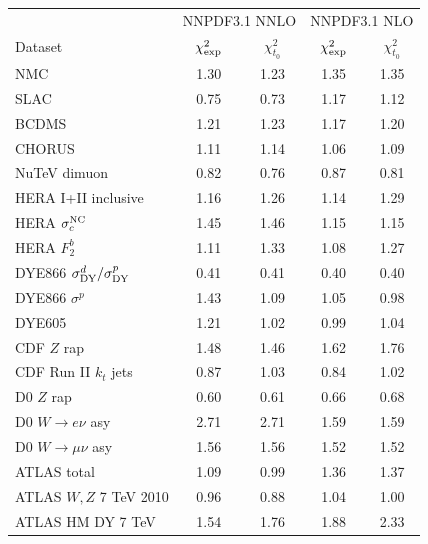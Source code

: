 \begin{table}[t]
\begin{center}
  \scriptsize
  \renewcommand{\arraystretch}{1.10}
\begin{tabular}{|l|c|c||c|c|}
\hline
 & \multicolumn{2}{c|}{NNPDF3.1 NNLO } & \multicolumn{2}{c|}{NNPDF3.1 NLO } \\
Dataset & $\chi^2_{\rm exp}$ & $\chi^2_{t_0}$ & $\chi^2_{\rm exp}$  & $\chi^2_{t_0}$    \\
\hline
\hline
NMC    &    1.30   &   1.23   &   1.35   &   1.35  \\    
SLAC    &    0.75   &   0.73   &   1.17   &   1.12  \\    
BCDMS    &    1.21   &   1.23   &   1.17   &   1.20  \\    
CHORUS    &    1.11   &   1.14   &   1.06   &   1.09  \\    
NuTeV dimuon    &    0.82   &   0.76   &   0.87   &   0.81  \\
\hline
HERA I+II inclusive    &    1.16   &   1.26   &   1.14   &   1.29  \\    
HERA $\sigma_c^{\rm NC}$    &    1.45   &   1.46   &   1.15   &   1.15  \\    
HERA $F_2^b$   &    1.11   &   1.33   &   1.08   &   1.27  \\    
\hline
\hline
DYE866 $\sigma^d_{\rm DY}/\sigma^p_{\rm DY}$    &    0.41   &   0.41   &   0.40   &   0.40  \\    
DYE866 $\sigma^p$     &    1.43   &   1.09   &   1.05   &   0.98  \\    
DYE605    &    1.21   &   1.02   &   0.99   &   1.04  \\    
\hline
CDF $Z$ rap     &    1.48   &   1.46   &   1.62   &   1.76  \\    
CDF Run II $k_t$ jets    &    0.87   &   1.03   &   0.84   &   1.02  \\
\hline
D0 $Z$ rap    &    0.60   &   0.61   &   0.66   &   0.68  \\    
D0 $W\to e\nu$  asy    &    2.71   &   2.71   &   1.59   &   1.59  \\    
D0 $W\to \mu\nu$  asy    &    1.56   &   1.56   &   1.52   &   1.52  \\
\hline
\hline
ATLAS total   &    1.09   &   0.99   &   1.36   &   1.37  \\    
ATLAS $W,Z$ 7 TeV 2010    &    0.96   &   0.88   &   1.04   &   1.00  \\    
ATLAS HM DY 7 TeV    &    1.54   &   1.76   &   1.88   &   2.33  \\    

\end{tabular}
\end{center}
\end{table}
